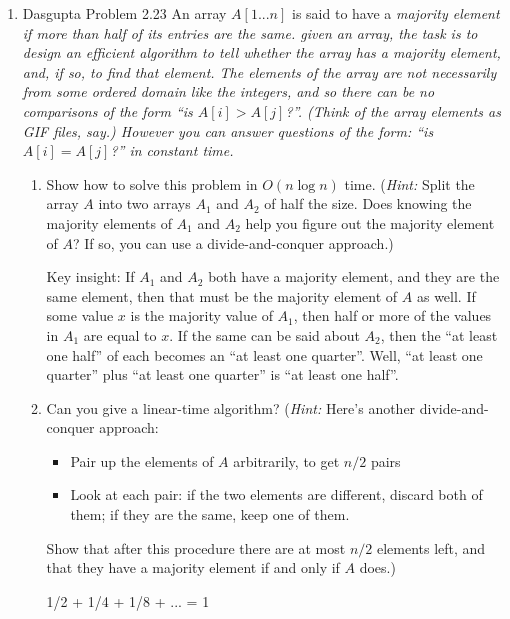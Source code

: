 \documentclass[a4paper,12pt]{article}
\begin{document}
\begin{enumerate}
\item Dasgupta Problem 2.23
An array $A[1...n]$ is said to have a \em{majority element} if more than half of its entries are the same. given an array, the task is to design an efficient algorithm to tell whether the array has a majority element, and, if so, to find that element. The elements of the array are not necessarily from some ordered domain like the integers, and so there can be no comparisons of the form ``is $A[i] > A[j]$?''. (Think of the array elements as GIF files, say.) However you \em{can} answer questions of the form: ``is $A[i] = A[j]$?'' in constant time.

\begin{enumerate}
    \item Show how to solve this problem in $O(n\log n)$ time. (\emph{Hint:} Split the array $A$ into two arrays $A_1$ and $A_2$ of half the size. Does knowing the majority elements of $A_1$ and $A_2$ help you figure out the majority element of $A$? If so, you can use a divide-and-conquer approach.)

    \vspace{5mm}

    Key insight: If $A_1$ and $A_2$ both have a majority element, and they are the same element, then that must be the majority element of $A$ as well. If some value $x$ is the majority value of $A_1$, then half or more of the values in $A_1$ are equal to $x$. If the same can be said about $A_2$, then the ``at least one half'' of each becomes an ``at least one quarter''. Well, ``at least one quarter'' plus ``at least one quarter'' is ``at least one half''.

    \item Can you give a linear-time algorithm? (\emph{Hint:} Here's another divide-and-conquer approach:
        \begin{itemize}
            \item Pair up the elements of $A$ arbitrarily, to get $n/2$ pairs
            \item Look at each pair: if the two elements are different, discard both of them; if they are the same, keep one of them.
        \end{itemize}
    Show that after this procedure there are at most $n/2$ elements left, and that they have a majority element if and only if $A$ does.)

    \vspace{5mm}

    1/2 + 1/4 + 1/8 + ... = 1

\end{enumerate}

\end{enumerate}
\end{document}
